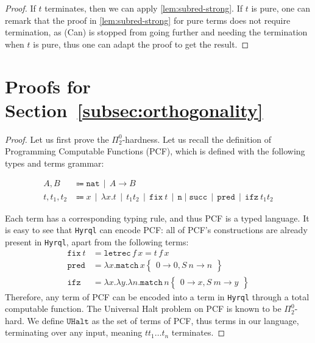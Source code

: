 \documentclass[10pt,a4paper]{article}
\newcommand{\nat}{\mathtt{nat}}
\newcommand{\textmatch}{\ensuremath{\mathtt{match}}}
\newcommand{\textletrec}{\ensuremath{\mathtt{letrec}}}
\newcommand{\match}[2]{
  \textmatch\,#1\left\{\! \begin{aligned} #2 \end{aligned}\right\}
}
\newcommand{\lbd}[2]{\lambda #1 .#2}
\newcommand{\letrec}[3]{\textletrec\,#1\,#2=#3}
\newcommand{\pitwo}{\Pi_2^0}
\newcommand{\uhalt}{\mathtt{UHalt}}
\newcommand{\gmid}{\,\mid\,}
\newcommand{\hyrql}{{{\tt{Hyrql}}}}
\begin{document}
\subred*

\begin{proof}
  If $t$ terminates, then we can apply \autoref{lem:subred-strong}.
  If $t$ is pure, one can remark that the proof in \autoref{lem:subred-strong}
  for pure terms does not require termination, as (Can) is stopped from
  going further and needing the termination when $t$ is pure, thus one
  can adapt the proof to get the result.
\end{proof}

\section{Proofs for Section~\ref{subsec:orthogonality}}


\orthoundecide*

\begin{proof}
  Let us first prove the $\pitwo$-hardness.
  Let us recall the definition of Programming Computable
  Functions (PCF), which is defined with the following types and terms grammar:

  \[
    \begin{aligned}
      A, B &\Coloneqq \nat \gmid A \to B \\
      t, t_1, t_2 &\Coloneqq x \gmid \lbd x t \gmid t_1 t_2 \gmid
      \mathtt{fix}~t \gmid \mathtt n \mid \mathtt{succ} \gmid \mathtt{pred}
      \gmid \mathtt{ifz}~t_1 t_2
    \end{aligned}
  \]

  Each term has a corresponding typing rule, and thus PCF is a typed language.
  It is easy to see that \hyrql{} can encode PCF: all of PCF's constructions are
  already present in \hyrql{}, apart from the following terms:
  \[
    \begin{aligned}
      \mathtt{fix}~t &= \letrec f x t\,f\,x \\
      \mathtt{pred} &= \lbd x \match x {0 \to 0, S~n \to n} \\
      \mathtt{ifz} &= \lbd x \lbd y \lbd n \match n {0 \to x, S~m \to y}
    \end{aligned}
  \]
  Therefore, any term of PCF can be encoded into a term in \hyrql{}
  through a total computable function.
  The Universal Halt problem on PCF is known to be $\pitwo$-hard.
  We define $\uhalt$ as the set of terms of PCF, thus terms
  in our language, terminating over any input,
  meaning $t t_1 \dots t_n$ terminates.


\end{proof}
\end{document}
